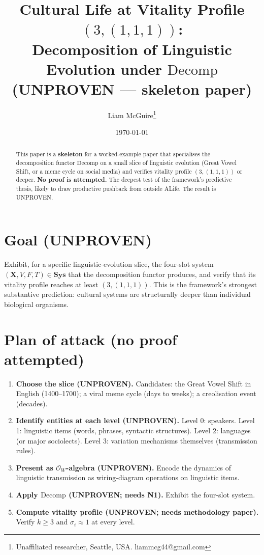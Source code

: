 \documentclass[11pt]{article}
\title{Cultural Life at Vitality Profile $(3, (1, 1, 1))$: \\
       Decomposition of Linguistic Evolution under $\mathrm{Decomp}$ \\
       \large (UNPROVEN --- skeleton paper)}
\author{Liam McGuire\thanks{Unaffiliated researcher, Seattle, USA. liammcg44@gmail.com}}
\date{\today}
\theoremstyle{plain}
\theoremstyle{definition}
\newcommand{\X}{\mathbf{X}}
\begin{document}
\maketitle

\begin{abstract}
This paper is a \textbf{skeleton} for a worked-example paper that
specialises the decomposition functor $\mathrm{Decomp}$ on a small
slice of linguistic evolution (Great Vowel Shift, or a meme cycle on
social media) and verifies vitality profile $(3, (1, 1, 1))$ or
deeper. \textbf{No proof is attempted.} The deepest test of the
framework's predictive thesis, likely to draw productive pushback
from outside ALife. The result is UNPROVEN.
\end{abstract}

\section{Goal (UNPROVEN)}

Exhibit, for a specific linguistic-evolution slice, the four-slot
system $(\X, V, F, T) \in \mathbf{Sys}$ that the decomposition
functor produces, and verify that its vitality profile reaches at
least $(3, (1, 1, 1))$. This is the framework's strongest
substantive prediction: cultural systems are structurally deeper
than individual biological organisms.

\section{Plan of attack (no proof attempted)}

\begin{enumerate}[leftmargin=2em,itemsep=4pt]
  \item \textbf{Choose the slice (UNPROVEN).} Candidates: the Great
    Vowel Shift in English (1400--1700); a viral meme cycle (days
    to weeks); a creolisation event (decades).
  \item \textbf{Identify entities at each level (UNPROVEN).} Level 0:
    speakers. Level 1: linguistic items (words, phrases, syntactic
    structures). Level 2: languages (or major sociolects).
    Level 3: variation mechanisms themselves (transmission rules).
  \item \textbf{Present as $\mathcal{O}_W$-algebra (UNPROVEN).}
    Encode the dynamics of linguistic transmission as wiring-diagram
    operations on linguistic items.
  \item \textbf{Apply $\mathrm{Decomp}$ (UNPROVEN; needs N1).}
    Exhibit the four-slot system.
  \item \textbf{Compute vitality profile (UNPROVEN; needs methodology
    paper).} Verify $k \geq 3$ and $\sigma_i \approx 1$ at every
    level.
\end{enumerate}
\end{document}
